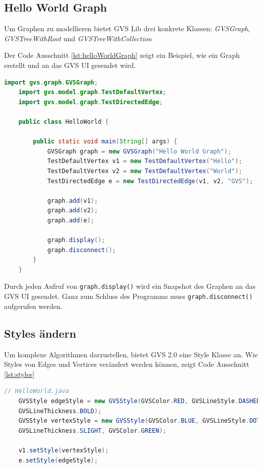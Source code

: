 \documentclass[11pt,a4paper,english,oneside]{book}
\numberwithin{equation}{chapter}
\begin{document}
	\subsection{Hello World Graph}
	Um Graphen zu modellieren bietet GVS Lib drei konkrete Klassen: \textit{GVSGraph}, \textit{GVSTreeWithRoot} und \textit{GVSTreeWithCollection}
	
	Der Code Ausschnitt \ref{lst:helloWorldGraph} zeigt ein Beispiel, wie ein Graph erstellt und an das GVS UI gesendet wird.
	
	\begin{lstlisting}[language=java, frame=single, caption={Hello World Graph}, label={lst:helloWorldGraph}]
	import gvs.graph.GVSGraph;
	import gvs.model.graph.TestDefaultVertex;
	import gvs.model.graph.TestDirectedEdge;
	
	public class HelloWorld {
	
		public static void main(String[] args) {
			GVSGraph graph = new GVSGraph("Hello World Graph");
			TestDefaultVertex v1 = new TestDefaultVertex("Hello");
			TestDefaultVertex v2 = new TestDefaultVertex("World");
			TestDirectedEdge e = new TestDirectedEdge(v1, v2, "GVS");
			
			graph.add(v1);
			graph.add(v2);
			graph.add(e);
			
			graph.display();
			graph.disconnect();
		}
	}
	\end{lstlisting}	
	
	Durch jeden Aufruf von \lstinline{graph.display()} wird ein Snapshot des Graphen an das GVS UI gesendet. Ganz zum Schluss des Programms muss \lstinline{graph.disconnect()} aufgerufen werden.
	
	\subsection{Styles ändern}
	Um komplexe Algorithmen darzustellen, bietet GVS 2.0 eine Style Klasse an. Wie Styles von Edges und Vertices verändert werden können, zeigt Code Ausschnitt \ref{lst:styles}
	
	\begin{lstlisting}[language=java, frame=single, caption={Styles verändern}, label={lst:styles}]
	// HelloWorld.java
	GVSStyle edgeStyle = new GVSStyle(GVSColor.RED, GVSLineStyle.DASHED,
	GVSLineThickness.BOLD);
	GVSStyle vertexStyle = new GVSStyle(GVSColor.BLUE, GVSLineStyle.DOTTED,
	GVSLineThickness.SLIGHT, GVSColor.GREEN);
	
	v1.setStyle(vertexStyle);
	e.setStyle(edgeStyle);
	\end{lstlisting}
	
\end{document}
